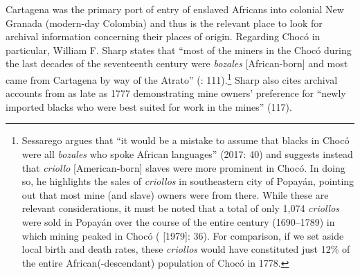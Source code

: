 \documentclass[output=paper,colorlinks,citecolor=brown]{langscibook}
\begin{document}
Cartagena was the primary port of entry of enslaved Africans into colonial New Granada (modern-day Colombia) and thus is the relevant place to look for archival information concerning their places of origin. Regarding Chocó in particular, William F. Sharp states that “most of the miners in the Chocó during the last decades of the seventeenth century were \emph{bozales} [African-born] and most came from Cartagena by way of the Atrato” (\cite{Sharp_1976}: 111).\footnote{Sessarego argues that “it would be a mistake to assume that blacks in Chocó were all \emph{bozales} who spoke African languages” (2017: 40) and suggests instead that \emph{criollo} [American-born] slaves were more prominent in Chocó. In doing so, he highlights the sales of \emph{criollos} in southeastern city of Popayán, pointing out that most mine (and slave) owners were from there. While these are relevant considerations, it must be noted that a total of only 1,074 \emph{criollos} were sold in Popayán over the course of the entire century (1690--1789) in which mining peaked in Chocó (\cite{Colmenares_1997} [1979]: 36). For comparison, if we set aside local birth and death rates, these \emph{criollos} would have constituted just 12\% of the entire African(-descendant) population of Chocó in 1778.} Sharp also cites archival accounts from as late as 1777 demonstrating mine owners’ preference for “newly imported blacks who were best suited for work in the mines” (117). 

\begin{table}[!ht]
\centering
\setlength{\tabcolsep}{3.5pt}
\caption{Broad regions of origin of Africans disembarking in Cartagena (late 17\textsuperscript{th}-18\textsuperscript{th} c.)}
\label{tab:tab2_05}
\end{table}
\end{document}
